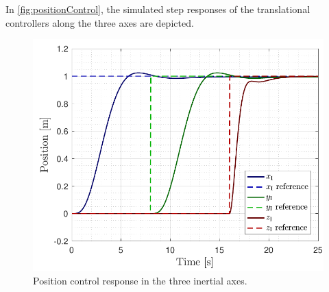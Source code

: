 In \autoref{fig:positionControl}, the simulated step responses of the translational controllers along the three axes are depicted.
\begin{figure}[H]
	\centering
	\includegraphics[width=.4\textwidth]{figures/PositionControl}
	\caption{Position control response in the three inertial axes. }
	\label{fig:positionControl}
\end{figure}
%
